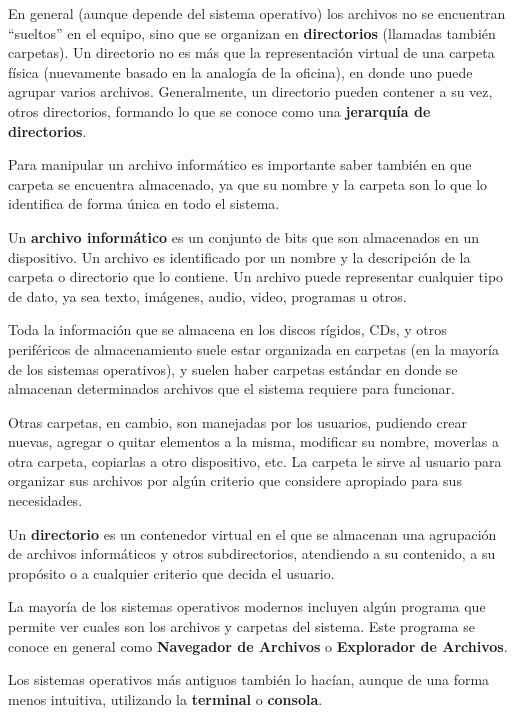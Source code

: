 En general (aunque depende del sistema operativo) los archivos no se encuentran
``sueltos'' en el equipo, sino que se organizan en \textbf{directorios} (llamadas
también carpetas). Un directorio no es más que la representación virtual de una
carpeta física (nuevamente basado en la analogía de la oficina), en donde uno
puede agrupar varios archivos. Generalmente, un directorio pueden contener a su
vez, otros directorios, formando lo que se conoce como una \textbf{jerarquía de
directorios}.

Para manipular un archivo informático es importante saber también en que carpeta
se encuentra almacenado, ya que su nombre y la carpeta son lo que lo identifica
de forma única en todo el sistema.

\begin{definition}
    Un \textbf{archivo informático} es un conjunto de bits que son almacenados en
    un dispositivo. Un archivo es identificado por un nombre y la descripción de
    la carpeta o directorio que lo contiene. Un archivo puede representar cualquier
    tipo de dato, ya sea texto, imágenes, audio, video, programas u otros.
    \autocite[part. IV]{gookin_2005}
\end{definition}

Toda la información que se almacena en los discos rígidos, CDs, y otros
periféricos de almacenamiento suele estar organizada en carpetas (en la mayoría
de los sistemas operativos), y suelen haber carpetas estándar en donde se
almacenan determinados archivos que el sistema requiere para funcionar.

Otras carpetas, en cambio, son manejadas por los usuarios, pudiendo crear nuevas,
agregar o quitar elementos a la misma, modificar su nombre, moverlas a otra carpeta,
copiarlas a otro dispositivo, etc. La carpeta le sirve al usuario para organizar
sus archivos por algún criterio que considere apropiado para sus necesidades.

\begin{definition}
    Un \textbf{directorio} es un contenedor virtual en el que se almacenan una
    agrupación de archivos informáticos y otros subdirectorios, atendiendo a su
    contenido, a su propósito o a cualquier criterio que decida el usuario.
    \autocite[part. IV]{gookin_2005}
\end{definition}

\begin{knowwhat}
La mayoría de los sistemas operativos modernos incluyen algún programa que
permite ver cuales son los archivos y carpetas del sistema. Este programa se
conoce en general como \textbf{Navegador de Archivos} o \textbf{Explorador de
Archivos}.

Los sistemas operativos más antiguos también lo hacían, aunque de una forma
menos intuitiva, utilizando la \textbf{terminal} o \textbf{consola}.
\end{knowwhat}

